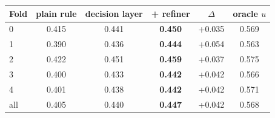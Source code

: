 \begin{tabular}{lccccc}
\toprule
Fold & plain rule & decision layer & + refiner & $\Delta$ & oracle $u$ \\
\midrule
0 & 0.415 & 0.441 & \textbf{0.450} & +0.035 & 0.569 \\
1 & 0.390 & 0.436 & \textbf{0.444} & +0.054 & 0.563 \\
2 & 0.422 & 0.451 & \textbf{0.459} & +0.037 & 0.575 \\
3 & 0.400 & 0.433 & \textbf{0.442} & +0.042 & 0.566 \\
4 & 0.401 & 0.438 & \textbf{0.442} & +0.042 & 0.571 \\
\midrule
all & 0.405 & 0.440 & \textbf{0.447} & +0.042 & 0.568 \\
\bottomrule
\end{tabular}
